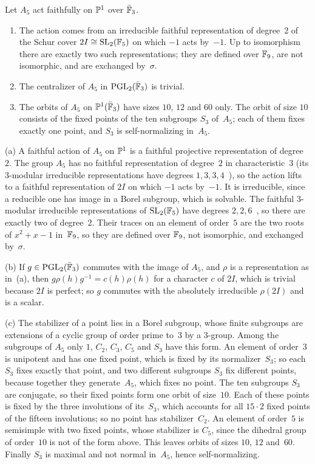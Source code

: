 \begin{lemma}\label{lem:A5}
\notformalized
Let $A_5$ act faithfully on $\mathbb{P}^1$ over $\bar{\mathbb{F}}_3$.
\begin{enumerate}[label=(\alph*)]
\item The action comes from an irreducible faithful representation of degree~$2$ of the Schur cover $2I\cong\operatorname{SL}_2(\mathbb{F}_5)$
on which $-1$ acts by~$-1$. Up to isomorphism there are exactly two such representations; they are defined over $\mathbb{F}_9$,
are not isomorphic, and are exchanged by~$\sigma$.
\item The centralizer of $A_5$ in $\operatorname{PGL}_2(\bar{\mathbb{F}}_3)$ is trivial.
\item The orbits of $A_5$ on $\mathbb{P}^1(\bar{\mathbb{F}}_3)$ have sizes $10$, $12$ and $60$ only. The orbit of size $10$ consists of the
fixed points of the ten subgroups $S_3$ of~$A_5$; each of them fixes exactly one point, and $S_3$ is self-normalizing
in~$A_5$.
\end{enumerate}
\end{lemma}
\begin{informalproof}
(a) A faithful action of $A_5$ on $\mathbb{P}^1$ is a faithful projective representation of degree~$2$. The group $A_5$ has no
faithful representation of degree~$2$ in characteristic~$3$ (its $3$-modular irreducible representations have degrees
$1,3,3,4$~\cite{JLPW1995}), so the action lifts to a faithful representation of $2I$ on which $-1$ acts by~$-1$. It is
irreducible, since a reducible one has image in a Borel subgroup, which is solvable. The faithful $3$-modular irreducible
representations of $\operatorname{SL}_2(\mathbb{F}_5)$ have degrees $2,2,6$~\cite{JLPW1995}, so there are exactly two of degree~$2$. Their
traces on an element of order~$5$ are the two roots of $x^2+x-1$ in~$\mathbb{F}_9$, so they are defined over $\mathbb{F}_9$, not
isomorphic, and exchanged by~$\sigma$.

(b) If $g\in\operatorname{PGL}_2(\bar{\mathbb{F}}_3)$ commutes with the image of $A_5$, and $\rho$ is a representation as in~(a), then
$g\rho(h)g^{-1}=c(h)\rho(h)$ for a character $c$ of $2I$, which is trivial because $2I$ is perfect; so $g$ commutes with
the absolutely irreducible $\rho(2I)$ and is a scalar.

(c) The stabilizer of a point lies in a Borel subgroup, whose finite subgroups are extensions of a cyclic group of order
prime to~$3$ by a $3$-group. Among the subgroups of $A_5$ only $1$, $C_2$, $C_3$, $C_5$ and $S_3$ have this form. An
element of order~$3$ is unipotent and has one fixed point, which is fixed by its normalizer~$S_3$; so each $S_3$ fixes
exactly that point, and two different subgroups $S_3$ fix different points, because together they generate~$A_5$, which
fixes no point. The ten subgroups $S_3$ are conjugate, so their fixed points form one orbit of size~$10$. Each of these
points is fixed by the three involutions of its~$S_3$, which accounts for all $15\cdot2$ fixed points of the fifteen
involutions; so no point has stabilizer~$C_2$. An element of order~$5$ is semisimple with two fixed points, whose
stabilizer is $C_5$, since the dihedral group of order~$10$ is not of the form above. This leaves orbits of sizes $10$,
$12$ and~$60$. Finally $S_3$ is maximal and not normal in~$A_5$, hence self-normalizing.
\end{informalproof}

